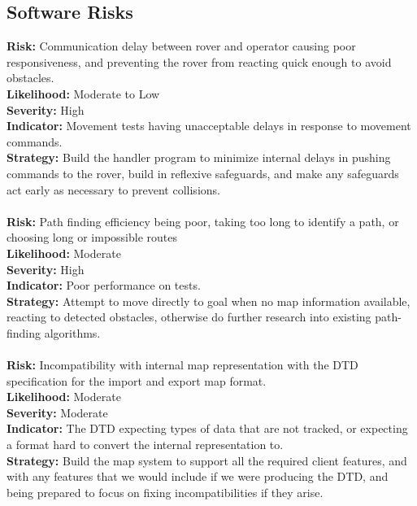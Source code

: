 \documentclass[12pt,a4paper]{article}
\begin{document}
    \subsection{Software Risks}
    \textbf{Risk:} Communication delay between rover and operator causing poor responsiveness, and preventing the rover from reacting quick enough to avoid obstacles.\\
    \textbf{Likelihood:} Moderate to Low\\
    \textbf{Severity:} High\\
    \textbf{Indicator:} Movement tests having unacceptable delays in response to movement commands.\\
    \textbf{Strategy:} Build the handler program to minimize internal delays in pushing commands to the rover, build in reflexive safeguards, and make any safeguards act early as necessary to prevent collisions.\\ \\
\textbf{Risk:} Path finding efficiency being poor, taking too long to identify a path, or choosing long or impossible routes\\
    \textbf{Likelihood:} Moderate\\
    \textbf{Severity:} High\\
    \textbf{Indicator:} Poor performance on tests.\\
    \textbf{Strategy:} Attempt to move directly to goal when no map information available, reacting to detected obstacles, otherwise do further research into existing path-finding algorithms.\\ \\
    \textbf{Risk:} Incompatibility with internal map representation with the DTD specification for the import and export map format.\\
    \textbf{Likelihood:} Moderate\\
    \textbf{Severity:} Moderate\\
    \textbf{Indicator:} The DTD expecting types of data that are not tracked, or expecting a format hard to convert the internal representation to.\\
    \textbf{Strategy:} Build the map system to support all the required client features, and with any features that we would include if we were producing the DTD, and being prepared to focus on fixing incompatibilities if they arise.\\
    
	\newpage
	
\end{document}
